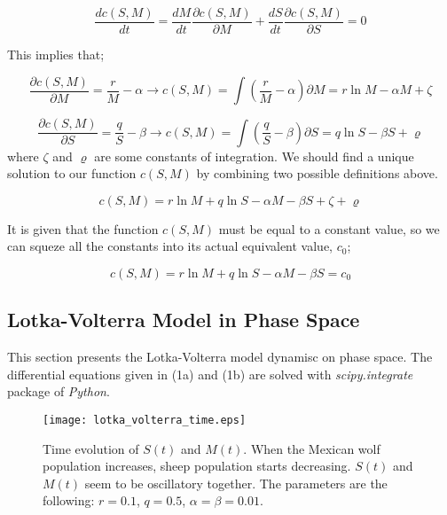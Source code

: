 \documentclass[12pt]{article}
\begin{document}
\begin{equation}
\frac{d c(S,M)}{dt} = \frac{dM}{dt} \frac{\partial c(S,M)}{\partial M} + \frac{dS}{dt} \frac{\partial c(S,M)}{\partial S} = 0
\end{equation}

This implies that;

\begin{equation*}
\frac{\partial c(S,M)}{\partial M} = \frac{r}{M} - \alpha \longrightarrow c(S,M) = \int (\frac{r}{M} - \alpha) \partial M = r \ln M - \alpha M + \zeta
\end{equation*}

\begin{equation*}
\frac{\partial c(S,M)}{\partial S} = \frac{q}{S} - \beta \longrightarrow c(S,M) = \int (\frac{q}{S} - \beta) \partial S = q \ln S - \beta S + \varrho
\end{equation*}
where $\zeta$ and $\varrho$ are some constants of integration. We should find a unique solution to our function $c(S,M)$ by combining two possible definitions above.

\begin{equation}
c(S,M) = r \ln M + q \ln S -\alpha M - \beta S  + \zeta +\varrho 
\end{equation}

It is given that the function $c(S,M)$ must be equal to a constant value, so we can squeze all the constants into its actual equivalent value, $c_0$;

\begin{equation}
c(S,M) = r \ln M + q \ln S -\alpha M - \beta S   = c_0
\end{equation}

\subsection{Lotka-Volterra Model in Phase Space}

This section presents the Lotka-Volterra model dynamisc on phase space. The differential equations given in (1a) and (1b) are solved with \textit{scipy.integrate} package of \textit{Python}. 

\begin{figure}[h!]
	\centering
	\texttt{[image: lotka\_volterra\_time.eps]}
		\caption{Time evolution of $S(t)$ and $M(t)$. When the Mexican wolf population increases, sheep population starts decreasing. $S(t)$ and $M(t)$ seem to be oscillatory together. The parameters are the following: $r=0.1$, $q=0.5$, $\alpha=\beta=0.01$.}
\end{figure}
\end{document}
